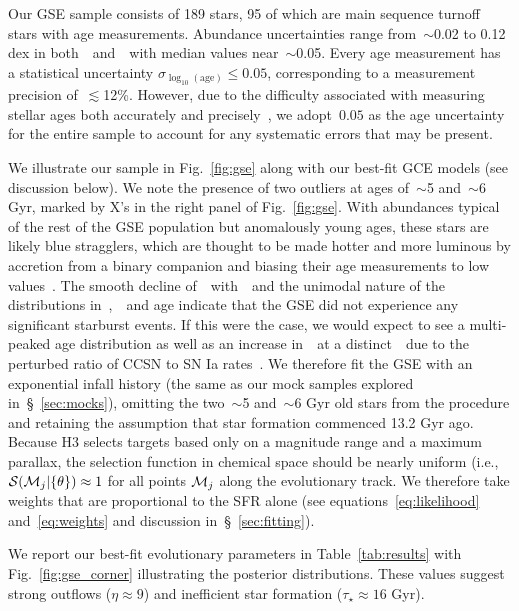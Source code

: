 \documentclass[ms.tex]{subfiles}
\begin{document}
Our GSE sample consists of 189 stars, 95 of which are main sequence turnoff
stars with age measurements.
Abundance uncertainties range from~$\sim$0.02 to 0.12 dex in
both~\feh~and~\afe~with median values near~$\sim$0.05.
Every age measurement has a statistical uncertainty
$\sigma_{\log_{10}(\text{age})} \leq 0.05$, corresponding to a measurement
precision of~$\lesssim$12\%.
However, due to the difficulty associated with measuring stellar ages both
accurately and precisely~\citep[e.g.,][]{Soderblom2010, Chaplin2013, Angus2019},
we adopt~$0.05$ as the age uncertainty for the entire sample to account for any
systematic errors that may be present.
\par
We illustrate our sample in Fig.~\ref{fig:gse} along with our best-fit GCE
models (see discussion below).
We note the presence of two outliers at ages of~$\sim$5 and~$\sim$6 Gyr, marked
by X's in the right panel of Fig.~\ref{fig:gse}.
With abundances typical of the rest of the GSE population but anomalously young
ages, these stars are likely blue stragglers, which are thought to be made
hotter and more luminous by accretion from a binary companion and biasing their
age measurements to low values~\citep[e.g.][]{Bond1971, Stryker1993}.
The smooth decline of~\afe~with~\feh~and the unimodal nature of the
distributions in~\feh,~\afe~and age indicate that the GSE did not experience
any significant starburst events.
If this were the case, we would expect to see a multi-peaked age distribution
as well as an increase in~\afe~at a distinct~\feh~due to the perturbed ratio of
CCSN to SN Ia rates~\citep{Johnson2020}.
We therefore fit the GSE with an exponential infall history (the same as our
mock samples explored in~\S~\ref{sec:mocks}), omitting the two~$\sim$5
and~$\sim$6 Gyr old stars from the procedure and retaining the assumption that
star formation commenced 13.2 Gyr ago.
Because H3 selects targets based only on a magnitude range and a maximum
parallax, the selection function in chemical space should be nearly uniform
(i.e.,~$\mathcal{S}(\mathcal{M}_j | \{\theta\}) \approx 1$ for all points
$\mathcal{M}_j$ along the evolutionary track.
We therefore take weights that are proportional to the SFR alone (see
equations~\ref{eq:likelihood} and~\ref{eq:weights} and discussion
in~\S~\ref{sec:fitting}).
\par
We report our best-fit evolutionary parameters in Table~\ref{tab:results}
with Fig.~\ref{fig:gse_corner} illustrating the posterior distributions.
These values suggest strong outflows ($\eta \approx 9$) and inefficient star
formation ($\tau_\star \approx 16$ Gyr).
\end{document}
